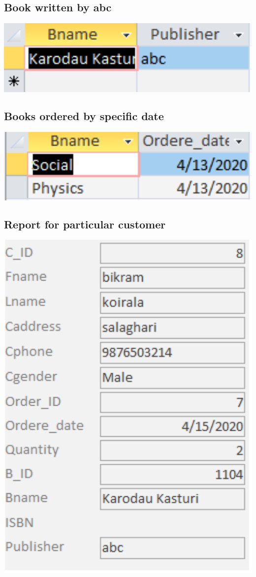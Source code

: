 \documentclass[17pt,a4paper,oneside,margin=1in]{article}
\begin{document}
\subsection{Book written by abc}
\includegraphics[width=1\textwidth]{./scrot/q2-2.png}

\subsection{Books ordered by specific date}
\includegraphics[width=1\textwidth]{./scrot/q2-3.png}

\subsection{Report for particular customer}
\includegraphics[width=1\textwidth]{./scrot/report.png}
\end{document}
